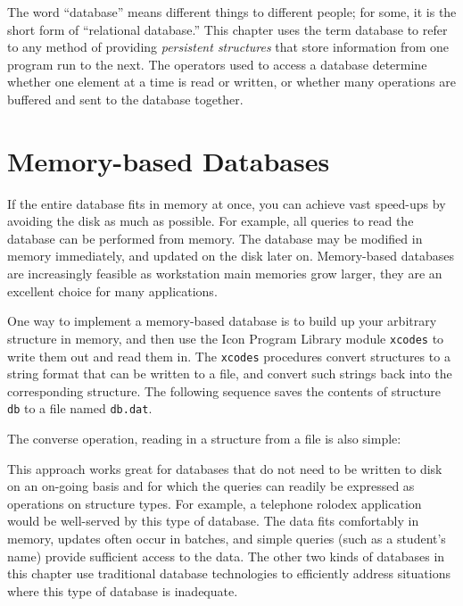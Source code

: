The word ``database'' means different things to different people; for
some, it is the short form of ``relational database.'' This chapter
uses the term database to refer to any method of providing
{\em persistent structures\/} that store information from one program
run to the next. The operators used to access a database determine
whether one element at a time is read or written, or whether many
operations are buffered and sent to the database together.

\section{Memory-based Databases}

If the entire database fits in memory at once, you can achieve vast
speed-ups by avoiding the disk as much as possible. For example, all
queries to read the database can be performed from memory.  The
database may be modified in memory immediately, and updated on the
disk later on. Memory-based databases are increasingly feasible as
workstation main memories grow larger, they are an excellent choice
for many applications.

One way to implement a memory-based database is to build up your
arbitrary structure in memory, and then use the Icon Program Library
module \texttt{xcodes} to write them out and read them
in. The \texttt{xcodes} procedures convert structures
to a string format that can be written to a file, and convert
such strings back into the corresponding structure.
The following sequence saves the
contents of structure \texttt{db} to a file named \texttt{db.dat}.


\noindent
The converse operation, reading in a structure from a file is also
simple:


This approach works great for databases that do not need to be written
to disk on an on-going basis and for which the queries can readily be
expressed as operations on structure types. For example, a telephone
rolodex application would be well-served by this type of database. The
data fits comfortably in memory, updates often occur in batches, and
simple queries (such as a student's name) provide
sufficient access to the data. The other two kinds of databases in this
chapter use traditional database technologies to efficiently address
situations where this type of database is inadequate.

